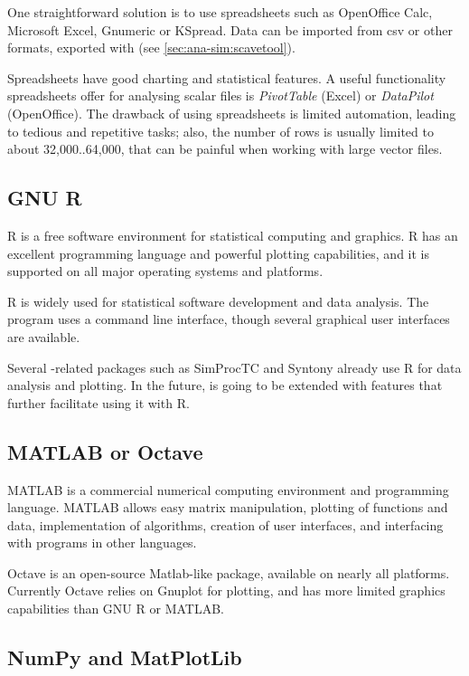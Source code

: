 One straightforward solution is to use spreadsheets such as OpenOffice
Calc, Microsoft Excel, Gnumeric or KSpread. Data can be imported from csv
or other formats, exported with  (see
\ref{sec:ana-sim:scavetool}).

Spreadsheets have good charting and statistical features. A useful
functionality spreadsheets offer for analysing scalar files is
\textit{PivotTable} (Excel) or \textit{DataPilot} (OpenOffice). The
drawback of using spreadsheets is limited automation, leading to tedious
and repetitive tasks; also, the number of rows is usually limited to about
32,000..64,000, that can be painful when working with large vector files.


\subsection{GNU R}
\label{sec:ana-sim:gnu-r}

R is a free software environment for statistical computing and graphics.
R has an excellent programming language and powerful plotting capabilities,
and it is supported on all major operating systems and platforms.

R is widely used for statistical software development and data analysis.
The program uses a command line interface, though several graphical user
interfaces are available.

Several {\opp}-related packages such as SimProcTC and Syntony already
use R for data analysis and plotting. In the future, {\opp} is going
to be extended with features that further facilitate using it with R.


\subsection{MATLAB or Octave}

MATLAB is a commercial numerical computing environment and programming language.
MATLAB allows easy matrix manipulation, plotting of functions and data,
implementation of algorithms, creation of user interfaces, and interfacing
with programs in other languages.

Octave is an open-source Matlab-like package, available on nearly all platforms.
Currently Octave relies on Gnuplot for plotting, and has more limited
graphics capabilities than GNU R or MATLAB.

\subsection{NumPy and MatPlotLib}

